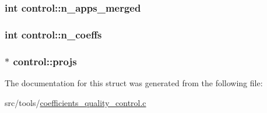 \subsubsection[{\texorpdfstring{n\+\_\+apps\+\_\+merged}{n_apps_merged}}]{\setlength{\rightskip}{0pt plus 5cm}int control\+::n\+\_\+apps\+\_\+merged}\hypertarget{structcontrol_abbe1758b776d494be512904ee15314ad}{}\label{structcontrol_abbe1758b776d494be512904ee15314ad}
\subsubsection[{\texorpdfstring{n\+\_\+coeffs}{n_coeffs}}]{\setlength{\rightskip}{0pt plus 5cm}int control\+::n\+\_\+coeffs}\hypertarget{structcontrol_ab6adbaa20aa1a77de8bbfa162e591710}{}\label{structcontrol_ab6adbaa20aa1a77de8bbfa162e591710}
\subsubsection[{\texorpdfstring{projs}{projs}}]{$\ast$ control\+::projs}\hypertarget{structcontrol_ab8a72c0f5de8d4f3dfe74f75c59116e1}{}\label{structcontrol_ab8a72c0f5de8d4f3dfe74f75c59116e1}


The documentation for this struct was generated from the following file\+:\begin{DoxyCompactItemize}
\item 
src/tools/\hyperlink{coefficients__quality__control_8c}{coefficients\+\_\+quality\+\_\+control.\+c}\end{DoxyCompactItemize}
